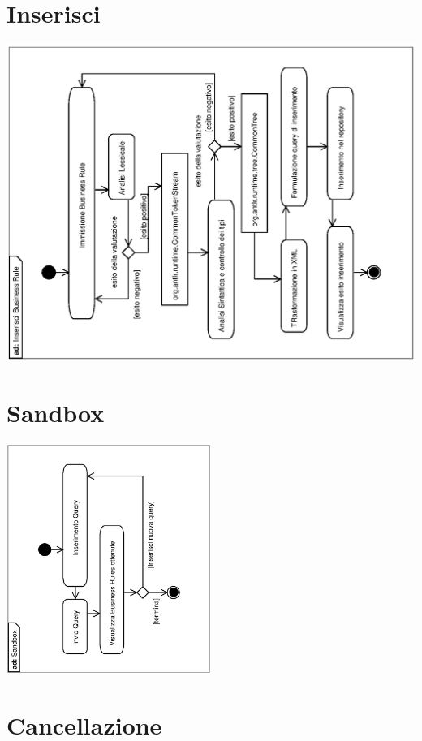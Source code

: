 \documentclass[11pt,titlepage,a4paper]{report}
\begin{document}
\section{Inserisci \br}

\begin{center}
 \includegraphics[width=1\textwidth, angle=-90]{InserisciBusinessRule.eps}
\end{center}


\section{Sandbox}

\begin{center}
 \includegraphics[width=0.5\textwidth, angle=-90]{Sandbox.eps}
\end{center}


\section{Cancellazione \br}
\end{document}
